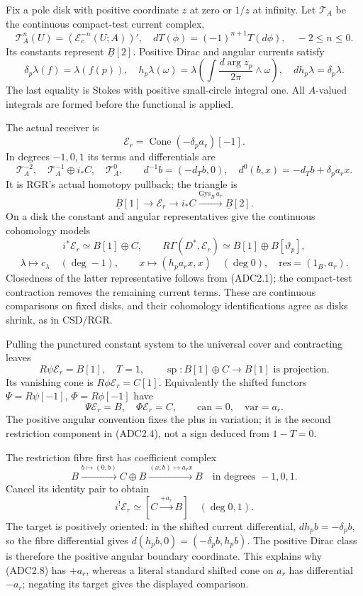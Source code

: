 Fix a pole disk with positive coordinate \(z\) at zero or \(1/z\) at
infinity. Let \(\mathscr T_A\) be the continuous compact-test current
complex, \[
\mathscr T_A^n(U)=(\mathcal E_c^{-n}(U;A))',
\quad dT(\phi)=(-1)^{n+1}T(d\phi),\quad -2\leq n\leq0.
\] Its constants represent \(\underline B[2]\). Positive Dirac and
angular currents satisfy \[
\delta_p\lambda(f)=\lambda(f(p)),\quad
h_p\lambda(\omega)=\lambda\left(\int\frac{d\arg z_p}{2\pi}\wedge\omega\right),
\quad dh_p\lambda=\delta_p\lambda.
\tag{ADC2.1}
\] The last equality is Stokes with positive small-circle integral one.
All \(A\)-valued integrals are formed before the functional is applied.

The actual receiver is \[
\mathscr E_r=\operatorname{Cone}(-\delta_pa_r)[-1].
\] In degrees \(-1,0,1\) its terms and differentials are \[
\mathscr T_A^{-2},\quad\mathscr T_A^{-1}\oplus i_*C,\quad
\mathscr T_A^0,\qquad
d^{-1}b=(-d_Tb,0),\quad
d^0(b,x)=-d_Tb+\delta_pa_rx.
\tag{ADC2.2}
\] It is RGR's actual homotopy pullback; the triangle is \[
\underline B[1]\longrightarrow\mathscr E_r
\longrightarrow i_*C\xrightarrow{\mathrm{Gys}_B\,a_r}\underline B[2].
\tag{ADC2.3}
\] On a disk the constant and angular representatives give the
continuous cohomology models \[
i^*\mathscr E_r\simeq B[1]\oplus C,\qquad
R\Gamma(D^*,\mathscr E_r)\simeq B[1]\oplus B[\vartheta_p],
\] \[
\lambda\longmapsto c_\lambda\quad(\deg-1),\qquad
x\longmapsto(h_pa_rx,x)\quad(\deg0),
\quad \mathrm{res}=(1_B,a_r).
\tag{ADC2.4}
\] Closedness of the latter representative follows from (ADC2.1); the
compact-test contraction removes the remaining current terms. These are
continuous comparisons on fixed disks, and their cohomology
identifications agree as disks shrink, as in CSD/RGR.

Pulling the punctured constant system to the universal cover and
contracting leaves \[
R\psi\mathscr E_r=B[1],\quad T=1,\qquad
\operatorname{sp}:B[1]\oplus C\longrightarrow B[1]
\text{ is projection}.
\tag{ADC2.5}
\] Its vanishing cone is \(R\phi\mathscr E_r=C[1]\). Equivalently the
shifted functors \(\Psi=R\psi[-1]\), \(\Phi=R\phi[-1]\) have \[
\Psi\mathscr E_r=B,\quad \Phi\mathscr E_r=C,\qquad
\mathrm{can}=0,\quad\mathrm{var}=a_r.
\tag{ADC2.6}
\] The positive angular convention fixes the plus in variation; it is
the second restriction component in (ADC2.4), not a sign deduced from
\(1-T=0\).

The restriction fibre first has coefficient complex \[
B\xrightarrow{b\mapsto(0,b)}C\oplus B
\xrightarrow{(x,b)\mapsto a_rx}B
\quad\text{in degrees }-1,0,1.
\tag{ADC2.7}
\] Cancel its identity pair to obtain \[
i^!\mathscr E_r\simeq[C\xrightarrow{+a_r}B]
\quad(\deg0,1).
\tag{ADC2.8}
\] The target is positively oriented: in the shifted current
differential, \(d h_pb=-\delta_pb\), so the fibre differential gives
\(d(h_pb,0)=(-\delta_pb,h_pb)\). The positive Dirac class is therefore
the positive angular boundary coordinate. This explains why (ADC2.8) has
\(+a_r\), whereas a literal standard shifted cone on \(a_r\) has
differential \(-a_r\); negating its target gives the displayed
comparison.

